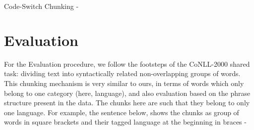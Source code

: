 \documentclass[11pt]{article}
\begin{document}
Code-Switch Chunking - \\





%
%


\section{Evaluation}
\label{sec:eval}

For the Evaluation procedure, we follow the footsteps of the CoNLL-2000 shared task: dividing text into syntactically related non-overlapping groups of words. This chunking mechanism \cite{tjong2003introduction} is very similar to ours, in terms of words which only belong to one category (here, language), and also evaluation based on the phrase structure present in the data. The chunks here are such that they belong to only one language. For example, the sentence below, shows the chunks as group of words in square brackets and their tagged language at the beginning in braces - \\
\end{document}
